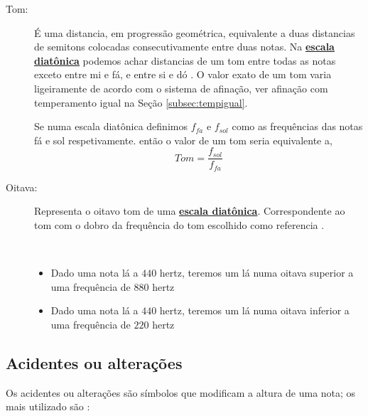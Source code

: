 \begin{description}
\item [Tom:] \label{sec:pos:TomDist}
É uma distancia, em progressão geométrica, equivalente a duas distancias de semitons colocadas consecutivamente entre duas notas.
Na \hyperref[sec:pos:Diatonica]{\textbf{escala diatônica}} podemos achar distancias de um tom entre todas as notas exceto entre mi e fá, e entre si e dó \cite[pp. 30]{cardoso1973curso}\cite[pp. 762]{apel1969harvard}.
O valor exato de um tom varia ligeiramente de acordo com o sistema de afinação, ver afinação com temperamento igual na Seção \ref{subsec:tempigual}. 
\begin{example}
Se numa escala diatônica definimos $f_{fa}$ e $f_{sol}$ como as frequências das notas fá e sol respetivamente.
então o valor de um tom seria equivalente a,
\begin{equation*}
Tom=\frac{f_{sol}}{f_{fa}}
\end{equation*}
\end{example}

\item [Oitava:] \label{sec:pos:Oitava}
Representa o oitavo tom de uma \hyperref[sec:pos:Diatonica]{\textbf{escala diatônica}}. 
Correspondente  ao tom com o dobro da frequência do tom escolhido como referencia \cite[pp. 589]{apel1969harvard}.
\begin{example}~
\begin{itemize}
\item Dado uma nota lá a $440$ hertz, teremos um lá numa oitava superior a uma frequência de $880$ hertz  
\item Dado uma nota lá a $440$ hertz, teremos um lá numa oitava inferior a uma frequência de $220$ hertz  
\end{itemize}
\end{example}

\end{description}

\subsection{Acidentes ou alterações}
\label{subsec:acidentes}


Os acidentes ou alterações são símbolos que modificam a altura de uma nota; 
os mais utilizado são \cite[pp. ]{alves2004teoria}:\\

